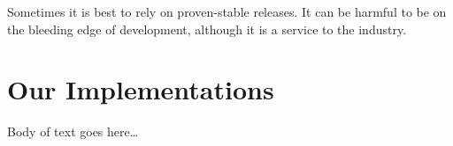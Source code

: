 \documentclass[conference]{IEEEtran}
\begin{document}
Sometimes it is best to rely on proven-stable releases. It can be harmful to be on the bleeding edge of development, although it is a service to the industry.

\section{Our Implementations}

Body of text goes here\ldots

%
%



%
%
\end{document}
